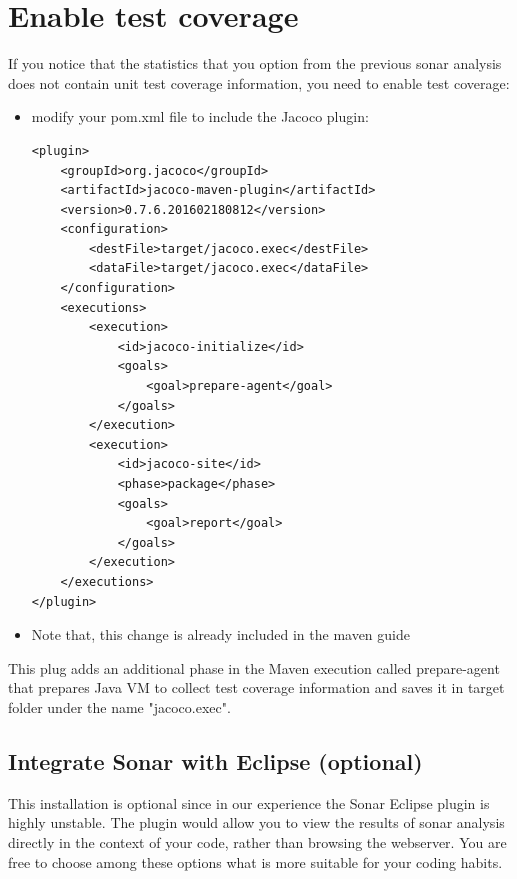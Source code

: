 \documentclass{article}
\newif\ifinstall
\begin{document}
\ifinstall
\else
\section{Enable test coverage}
If you notice that the statistics that you option from the previous
sonar analysis does not contain unit test coverage information, you
need to enable test coverage:

\begin{itemize}
\item modify your pom.xml file to include the Jacoco plugin:
\begin{lstlisting}
<plugin>
	<groupId>org.jacoco</groupId>
	<artifactId>jacoco-maven-plugin</artifactId>
	<version>0.7.6.201602180812</version>
	<configuration>
		<destFile>target/jacoco.exec</destFile>
		<dataFile>target/jacoco.exec</dataFile>
	</configuration>
	<executions>
		<execution>
			<id>jacoco-initialize</id>
			<goals>
				<goal>prepare-agent</goal>
			</goals>
		</execution>
		<execution>
			<id>jacoco-site</id>
			<phase>package</phase>
			<goals>
				<goal>report</goal>
			</goals>
		</execution>
	</executions>
</plugin>
\end{lstlisting}
\item Note that, this change is already included in the maven guide

\end{itemize}
This plug adds an additional phase in the Maven execution called 
prepare-agent that prepares Java VM to collect test coverage
information and saves it in target folder under the name
"jacoco.exec". 


\fi

\subsection{Integrate Sonar with Eclipse (optional)}

This installation is optional since in our experience the Sonar
Eclipse plugin is highly unstable. The plugin would allow you to view
the results of sonar analysis directly in the context of your code,
rather than browsing the webserver. You are free to choose among these
options what is more suitable for your coding habits. 
\end{document}
